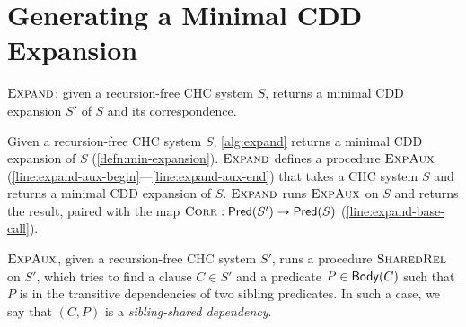 \section{Generating a Minimal CDD Expansion}
\label{app:cons-cdd}
\begin{algorithm}[t]
  \caption{$\textsc{Expand}$:
    given a recursion-free CHC system $S$, returns a minimal
    CDD expansion $S'$ of $S$ and its correspondence.}
  \label{alg:expand}
\end{algorithm}
%
Given a recursion-free CHC system $S$, \autoref{alg:expand} returns a
minimal CDD expansion of $S$ (\autoref{defn:min-expansion}).
%
$\textsc{Expand}$ defines a procedure $\textsc{ExpAux}$
(\autoref{line:expand-aux-begin}---\autoref{line:expand-aux-end}) that
takes a CHC system $S$ and returns a minimal CDD expansion of $S$.
%
$\textsc{Expand}$ runs $\textsc{ExpAux}$ on $S$ and
returns the result, paired with the map $\textsc{Corr}: \mathsf{Pred}( S' ) \to \mathsf{Pred}( S )$ 
(\autoref{line:expand-base-call}).

$\textsc{ExpAux}$, given a recursion-free CHC system $S'$,
runs a procedure $\textsc{SharedRel}$ on $S'$, which tries to
find a clause $C \in S'$ and a predicate $P \in \mathsf{Body}(C)$
such that $P$ is in the transitive dependencies of two sibling
predicates.
%
In such a case, we say that $(C, P)$ is a
\emph{sibling-shared dependency}.

